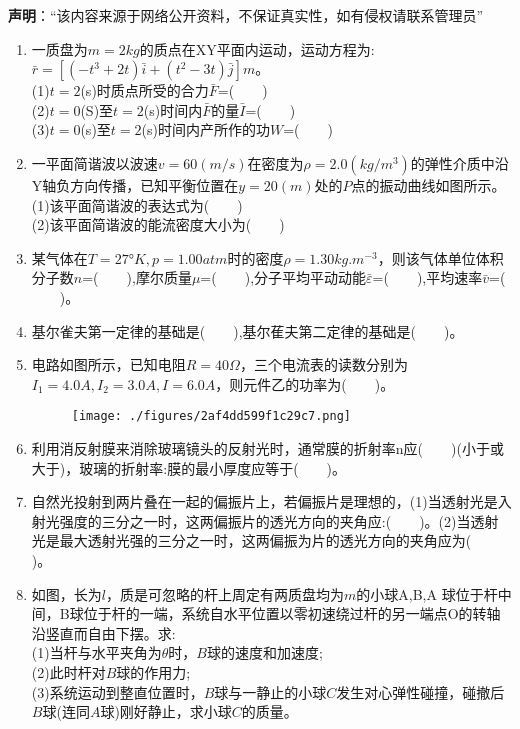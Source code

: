 
\textbf{声明}：“该内容来源于网络公开资料，不保证真实性，如有侵权请联系管理员”

\begin{enumerate}
\item 一质盘为$m=2kg$的质点在XY平面内运动，运动方程为:$\bar r =[(-t^3+2t)\bar i+(t^2-3t)\bar j]m$。\\
(1)$t=2$(s)时质点所受的合力$\bar F$=($\qquad$)\\
(2)$t=0$(S)至$t=2$(s)时间内$\bar F$的量$\bar I$=($\qquad$)\\
(3)$t=0$(s)至$t=2$(s)时间内产所作的功$W$=($\qquad$)
\item 一平面简谐波以波速$v=60(m/s)$在密度为$\rho=2.0(kg/m^3)$的弹性介质中沿Y轴负方向传播，已知平衡位置在$y=20(m)$处的$P$点的振动曲线如图所示。\\
(1)该平面简谐波的表达式为($\qquad$)\\
(2)该平面简谐波的能流密度大小为($\qquad$)
\item 某气体在$T=27$°$K,p=1.00atm$时的密度$\rho=1.30kg.m^{-3}$，则该气体单位体积分子数$n$=($\qquad$),摩尔质量$\mu$=($\qquad$),分子平均平动动能$\bar \varepsilon$=($\qquad$),平均速率$\bar v$=($\qquad$)。
\item 基尔雀夫第一定律的基础是($\qquad$),基尔萑夫第二定律的基础是($\qquad$)。
\item 电路如图所示，已知电阻$R=40\Omega$，三个电流表的读数分别为$I_1=4.0A,I_2=3.0A,I=6.0A$，则元件乙的功率为($\qquad$)。
\begin{figure}[ht]
\centering
\texttt{[image: ./figures/2af4dd599f1c29c7.png]}
\caption{} \label{fig_SD02_1}
\end{figure}
\item 利用消反射膜来消除玻璃镜头的反射光时，通常膜的折射率n应($\qquad$)(小于或大于)，玻璃的折射率:膜的最小厚度应等于($\qquad$)。
\item 自然光投射到两片叠在一起的偏振片上，若偏振片是理想的，(1)当透射光是入射光强度的三分之一时，这两偏振片的透光方向的夹角应:($\qquad$)。(2)当透射光是最大透射光强的三分之一时，这两偏振为片的透光方向的夹角应为($\qquad$)。
\item 如图，长为$l$，质是可忽略的杆上周定有两质盘均为$m$的小球A,B,A 球位于杆中间，B球位于杆的一端，系统自水平位置以零初速绕过杆的另一端点O的转轴沿竖直而自由下摆。求:\\
(1)当杆与水平夹角为$\theta$时，$B$球的速度和加速度;\\
(2)此时杆对$B$球的作用力;\\
(3)系统运动到整直位置时，$B$球与一静止的小球$C$发生对心弹性碰撞，碰撤后$B$球(连同$A$球)刚好静止，求小球$C$的质量。
\end{enumerate}
